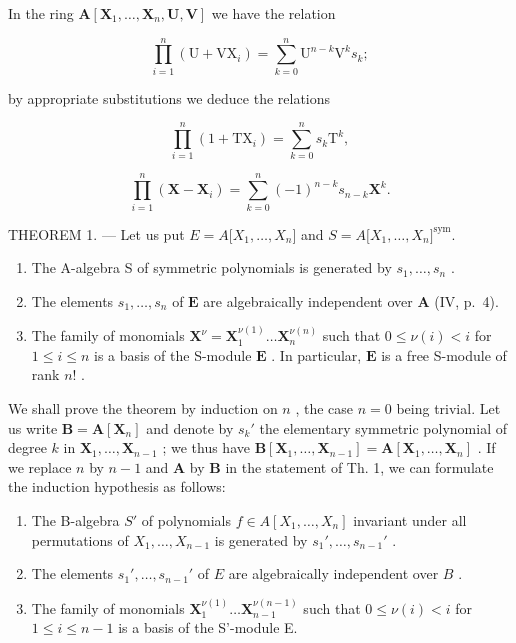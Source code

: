 In the ring \(\mathbf{A}[\mathbf{X}_1,\dots ,\mathbf{X}_n,\mathbf{U},\mathbf{V}]\) we have the relation

\[
\prod_ {i = 1} ^ {n} \left(\mathrm{U} + \mathrm{VX} _ {i}\right) = \sum_ {k = 0} ^ {n} \mathrm{U} ^ {n - k} \mathrm{V} ^ {k} s _ {k};\tag{2}
\]

by appropriate substitutions we deduce the relations

\[
\prod_ {i = 1} ^ {n} \left(1 + \mathrm{TX} _ {i}\right) = \sum_ {k = 0} ^ {n} s _ {k} \mathrm{T} ^ {k},\tag{3}
\]

\[
\prod_ {i = 1} ^ {n} \left(\mathbf {X} - \mathbf {X} _ {i}\right) = \sum_ {k = 0} ^ {n} (- 1) ^ {n - k} s _ {n - k} \mathbf {X} ^ {k}.\tag{4}
\]

THEOREM 1. --- Let us put \(E = A{[}X_{1}, \ldots, X_{n}{]}\) and \(S = A{[}X_{1}, \ldots, X_{n}{]}^{\text{sym}}\).

\begin{enumerate}
\def\labelenumi{\alph{enumi})}
\item
  The A-algebra S of symmetric polynomials is generated by \(s_1, \ldots, s_n\) .
\item
  The elements \(s_1, \ldots, s_n\) of \(\mathbf{E}\) are algebraically independent over \(\mathbf{A}\) (IV, p.~4).
\item
  The family of monomials \(\mathbf{X}^{\nu} = \mathbf{X}_1^{\nu(1)} \ldots \mathbf{X}_n^{\nu(n)}\) such that \(0 \leqslant \nu(i) < i\) for \(1 \leqslant i \leqslant n\) is a basis of the S-module \(\mathbf{E}\) . In particular, \(\mathbf{E}\) is a free S-module of rank \(n!\) .
\end{enumerate}

We shall prove the theorem by induction on \(n\) , the case \(n = 0\) being trivial. Let us write \(\mathbf{B} = \mathbf{A}[\mathbf{X}_n]\) and denote by \(s_k'\) the elementary symmetric polynomial of degree \(k\) in \(\mathbf{X}_1, \ldots, \mathbf{X}_{n-1}\) ; we thus have \(\mathbf{B}[\mathbf{X}_1, \ldots, \mathbf{X}_{n-1}] = \mathbf{A}[\mathbf{X}_1, \ldots, \mathbf{X}_n]\) . If we replace \(n\) by \(n-1\) and \(\mathbf{A}\) by \(\mathbf{B}\) in the statement of Th. 1, we can formulate the induction hypothesis as follows:

\begin{enumerate}
\def\labelenumi{(\Alph{enumi})}
\item
  The B-algebra \(S'\) of polynomials \(f \in A[X_1, \ldots, X_n]\) invariant under all permutations of \(X_1, \ldots, X_{n-1}\) is generated by \(s_1', \ldots, s_{n-1}'\) .
\item
  The elements \(s_1', \ldots, s_{n-1}'\) of \(E\) are algebraically independent over \(B\) .
\item
  The family of monomials \(\mathbf{X}_{1}^{\nu(1)}\ldots\mathbf{X}_{n-1}^{\nu(n-1)}\) such that \(0\leqslant\nu(i)<i\) for \(1\leqslant i\leqslant n-1\) is a basis of the S'-module E.
\end{enumerate}

